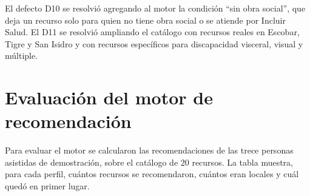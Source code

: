 El defecto D10 se resolvió agregando al motor la condición ``sin obra social'', que deja un recurso solo para quien no tiene obra social o se atiende por Incluir Salud. El D11 se resolvió ampliando el catálogo con recursos reales en Escobar, Tigre y San Isidro y con recursos específicos para discapacidad visceral, visual y múltiple.

\section{Evaluación del motor de recomendación}\label{sec:eval-motor}

Para evaluar el motor se calcularon las recomendaciones de las trece personas asistidas de demostración, sobre el catálogo de 20 recursos. La tabla muestra, para cada perfil, cuántos recursos se recomendaron, cuántos eran locales y cuál quedó en primer lugar.


